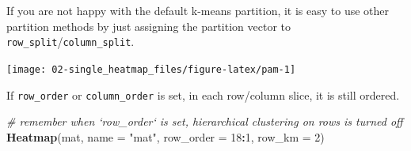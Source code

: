 \documentclass[]{book}
\newenvironment{Shaded}{\begin{snugshade}}{\end{snugshade}}
\newcommand{\KeywordTok}[1]{\textcolor[rgb]{0.13,0.29,0.53}{\textbf{#1}}}
\newcommand{\DataTypeTok}[1]{\textcolor[rgb]{0.13,0.29,0.53}{#1}}
\newcommand{\DecValTok}[1]{\textcolor[rgb]{0.00,0.00,0.81}{#1}}
\newcommand{\StringTok}[1]{\textcolor[rgb]{0.31,0.60,0.02}{#1}}
\newcommand{\CommentTok}[1]{\textcolor[rgb]{0.56,0.35,0.01}{\textit{#1}}}
\newcommand{\OperatorTok}[1]{\textcolor[rgb]{0.81,0.36,0.00}{\textbf{#1}}}
\newcommand{\NormalTok}[1]{#1}
\theoremstyle{definition}
\theoremstyle{definition}
\theoremstyle{definition}
\theoremstyle{remark}
\begin{document}
\begin{Shaded}
\end{Shaded}

If you are not happy with the default k-means partition, it is easy to
use other partition methods by just assigning the partition vector to
\texttt{row\_split}/\texttt{column\_split}.

\begin{Shaded}
\end{Shaded}

\begin{center}\texttt{[image: 02-single\_heatmap\_files/figure-latex/pam-1]} \end{center}

If \texttt{row\_order} or \texttt{column\_order} is set, in each
row/column slice, it is still ordered.

\begin{Shaded}
\begin{Highlighting}[]
\CommentTok{# remember when `row_order` is set, hierarchical clustering on rows is turned off}
\KeywordTok{Heatmap}\NormalTok{(mat, }\DataTypeTok{name =} \StringTok{"mat"}\NormalTok{, }\DataTypeTok{row_order =} \DecValTok{18}\OperatorTok{:}\DecValTok{1}\NormalTok{, }\DataTypeTok{row_km =} \DecValTok{2}\NormalTok{)}
\end{Highlighting}
\end{Shaded}
\end{document}
